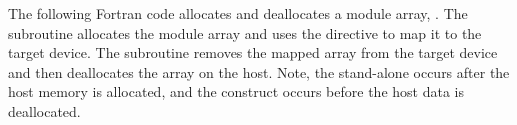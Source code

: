 
The following Fortran code allocates and deallocates a module array, .  The
 subroutine allocates the module array and uses the
 directive to map it to the target device. The
 subroutine removes the mapped array from the target device and
then deallocates the array on the host.  Note, the stand-alone 
 occurs after the host memory is allocated, and the 
 construct occurs before the host data is deallocated.


